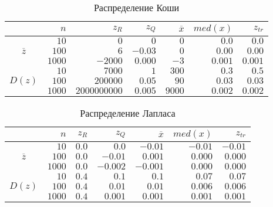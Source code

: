 \documentclass[zuev_report2.tex]{subfiles}
\begin{document}
\begin{table}[H]
\centering
\caption{Распределение Коши}
\begin{tabular}{c*6r}
\toprule
{} &         
$n$  & 
\centering $z_R$ & 
\centering $z_Q$ &
\centering $\overline{x}$& 
\centering $med(x)$ &
\centering $z_{tr}$ \tabularnewline
\midrule
\multirow{3}{*}{$\overline{z}$}
& $10$    & $0$     & $0$  & $0$  & $0.0$  & $0.0$ \\
& $100$   & $ 6$     & $-0.03$  & $0$  & $ 0.00$  & $ 0.00$ \\
& $1000$  & $-2000$  & $ 0.000$  & $-3$  & $ 0.001$  & $ 0.001$ \\
\midrule
\multirow{3}{*}{$D(z)$}
& $10$    & $7000$        & $1$  & $300$   & $0.3$  & $0.5$ \\
& $100$   & $200000$      & $0.05$  & $90$    & $0.03$  & $0.03$ \\
& $1000$  & $2000000000$  & $0.005$  & $9000$  & $0.002$  & $0.002$ \\
\bottomrule
\end{tabular}
\label{table:cauchy}
\end{table}

\begin{table}[H]
\centering
\caption{Распределение Лапласа}
\begin{tabular}{c*6r}
\toprule
{} &         
$n$ & 
\centering $z_R$ & 
\centering $z_Q$ &
\centering $\overline{x}$& 
\centering $med(x)$ &
\centering $z_{tr}$ \tabularnewline
\midrule
\multirow{3}{*}{$\overline{z}$}
& $10$    & $ 0.0$  & $0.0$  & $-0.01$  & $-0.01$  & $-0.01$ \\
& $100$   & $ 0.0$  & $-0.01$  & $ 0.001$  & $ 0.000$  & $ 0.000$ \\
& $1000$  & $0.0$  & $-0.002$  & $-0.001$  & $ 0.000$  & $ 0.000$ \\
\midrule
\multirow{3}{*}{$D(z)$}
& $10$    & $0.4$  & $0.1$  & $0.1$  & $0.07$  & $0.07$ \\
& $100$   & $0.4$  & $0.01$  & $0.01$  & $0.006$  & $0.006$ \\
& $1000$  & $0.4$  & $0.001$  & $0.001$  & $0.001$  & $0.001$ \\
\bottomrule
\end{tabular}
\label{table:laplace}
\end{table}
\end{document}
